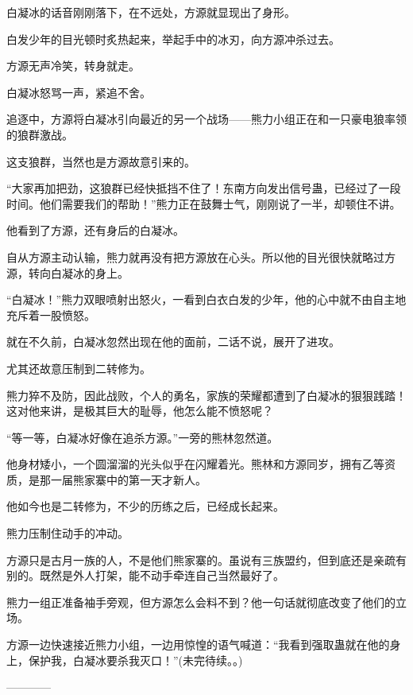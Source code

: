 \begin{this_body}
白凝冰的话音刚刚落下，在不远处，方源就显现出了身形。

白发少年的目光顿时炙热起来，举起手中的冰刃，向方源冲杀过去。

方源无声冷笑，转身就走。

白凝冰怒骂一声，紧追不舍。

追逐中，方源将白凝冰引向最近的另一个战场——熊力小组正在和一只豪电狼率领的狼群激战。

这支狼群，当然也是方源故意引来的。

“大家再加把劲，这狼群已经快抵挡不住了！东南方向发出信号蛊，已经过了一段时间。他们需要我们的帮助！”熊力正在鼓舞士气，刚刚说了一半，却顿住不讲。

他看到了方源，还有身后的白凝冰。

自从方源主动认输，熊力就再没有把方源放在心头。所以他的目光很快就略过方源，转向白凝冰的身上。

“白凝冰！”熊力双眼喷射出怒火，一看到白衣白发的少年，他的心中就不由自主地充斥着一股愤怒。

就在不久前，白凝冰忽然出现在他的面前，二话不说，展开了进攻。

尤其还故意压制到二转修为。

熊力猝不及防，因此战败，个人的勇名，家族的荣耀都遭到了白凝冰的狠狠践踏！这对他来讲，是极其巨大的耻辱，他怎么能不愤怒呢？

“等一等，白凝冰好像在追杀方源。”一旁的熊林忽然道。

他身材矮小，一个圆溜溜的光头似乎在闪耀着光。熊林和方源同岁，拥有乙等资质，是那一届熊家寨中的第一天才新人。

他如今也是二转修为，不少的历练之后，已经成长起来。

熊力压制住动手的冲动。

方源只是古月一族的人，不是他们熊家寨的。虽说有三族盟约，但到底还是亲疏有别的。既然是外人打架，能不动手牵连自己当然最好了。

熊力一组正准备袖手旁观，但方源怎么会料不到？他一句话就彻底改变了他们的立场。

方源一边快速接近熊力小组，一边用惊惶的语气喊道：“我看到强取蛊就在他的身上，保护我，白凝冰要杀我灭口！”(未完待续。。)

------------

\end{this_body}

